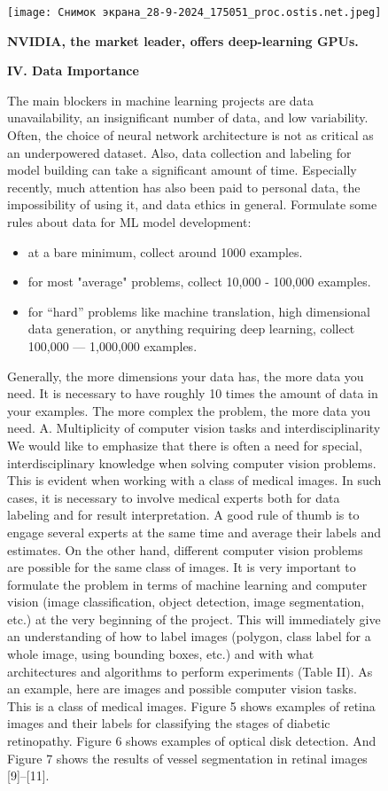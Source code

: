 \documentclass{article}
\begin{document}
\newpage
\begin{figure}[h]
    \centering
    \texttt{[image: Снимок экрана\_28-9-2024\_175051\_proc.ostis.net.jpeg]}
    \label{fig:enter-label}
    \begin{multicols}{2}
    \textbf{NVIDIA, the market leader, offers deep-learning GPUs.}


    \textbf{IV. Data Importance}
        
    
        




The main blockers in machine learning projects are
data unavailability, an insignificant number of data, and
low variability. Often, the choice of neural network
architecture is not as critical as an underpowered dataset.
Also, data collection and labeling for model building can
take a significant amount of time. Especially recently,
much attention has also been paid to personal data, the
impossibility of using it, and data ethics in general.
Formulate some rules about data for ML model development:
\setlength{\parskip}{0pt}
\begin{itemize}[noitemsep]
    \item 
\par
 at a bare minimum, collect around 1000 examples.
   \item 
 for most "average" problems, collect 10,000 -
100,000 examples.
   \item 
 for “hard” problems like machine translation, high
dimensional data generation, or anything requiring
deep learning, collect 100,000 — 1,000,000 examples.
\end{itemize}
Generally, the more dimensions your data has, the
more data you need. It is necessary to have roughly 10
times the amount of data in your examples. The more
complex the problem, the more data you need.
A. Multiplicity of computer vision tasks and interdisciplinarity
We would like to emphasize that there is often a need
for special, interdisciplinary knowledge when solving
computer vision problems. This is evident when working
with a class of medical images. In such cases, it is necessary to involve medical experts both for data labeling
and for result interpretation. A good rule of thumb is to
engage several experts at the same time and average their
labels and estimates.
On the other hand, different computer vision problems
are possible for the same class of images. It is very
important to formulate the problem in terms of machine learning and computer vision (image classification,
object detection, image segmentation, etc.) at the very
beginning of the project. This will immediately give an
understanding of how to label images (polygon, class
label for a whole image, using bounding boxes, etc.)
and with what architectures and algorithms to perform
experiments (Table II).
\columnbreak
 As an example, here are images and possible computer
vision tasks. This is a class of medical images. Figure 5
shows examples of retina images and their labels for
classifying the stages of diabetic retinopathy. Figure 6
shows examples of optical disk detection. And Figure 7
shows the results of vessel segmentation in retinal images
[9]–[11].


\end{multicols}
\end{figure}
\end{document}
